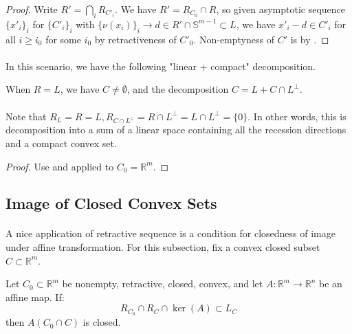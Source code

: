 \begin{proof}
	Write $R'=\bigcap_iR_{C'_i}$. We have $R'=R_{C_0}\cap R$, so given asymptotic sequence $\{x'_i\}_i$ for $\{C'_i\}_i$ with $\{\nu(x_i)\}_i\to d\in R'\cap \mathbb{S}^{m-1}\subset L$, we have $x'_i-d\in C'_i$ for all $i\geq i_0$ for some $i_0$ by retractiveness of $C'_0$. Non-emptyness of $C'$ is by .
\end{proof}

\paragraph{}In this scenario, we have the following "linear + compact" decomposition.

\begin{coro}\label{coro:014-decomp-compact}
	When $R=L$, we have $C\neq\emptyset$, and the decomposition $C=L+C\cap L^\perp$.
\end{coro}

\paragraph{}Note that $R_L=R=L,R_{C\cap L^{\perp}}=R\cap L^\perp=L\cap L^\perp=\{0\}$. In other words, this is decomposition into a sum of a linear space containing all the recession directions and a compact convex set.

\begin{proof}
	Use  and  applied to $C_0=\mathbb{R}^m$.
\end{proof}

\subsection{Image of Closed Convex Sets}

\paragraph{}A nice application of retractive sequence is a condition for closedness of image under affine transformation. For this subsection, fix a convex closed subset $C\subset \mathbb{R}^m$.

\begin{coro}\label{coro:014-closed-affine}
	Let $C_0\subset \mathbb{R}^m$ be nonempty, retractive, closed, convex, and let $A:\mathbb{R}^m\to \mathbb{R}^n$ be an affine map. If:
	\[
		R_{C_0}\cap R_C\cap \operatorname{ker}(A)\subset L_C
	\]
	then $A(C_0\cap C)$ is closed.
\end{coro}


